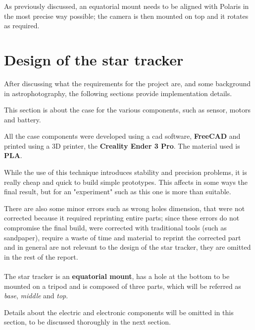 \documentclass[]{article}
\begin{document}
As previously discussed, an equatorial mount needs to be aligned with Polaris in the most precise way possible; the camera is then mounted on top and it rotates as required. 


\section{Design of the star tracker}
After discussing what the requirements for the project are, and some background in astrophotography, the following sections provide implementation details. 

This section is about the case for the various components, such as sensor, motors and battery. 

All the case components were developed using a cad software, \textbf{FreeCAD} and printed using a 3D printer, the \textbf{Creality Ender 3 Pro}. The material used is \textbf{PLA}. 
 
While the use of this technique introduces stability and precision problems, it is really cheap and quick to build simple prototypes. This affects in some ways  the final result, but for an "experiment" such as this one is more than suitable. 

There are also some minor errors such as wrong holes dimension, that were not corrected because it required reprinting entire parts; since these errors do not compromise the final build, were corrected with traditional tools (such as sandpaper), require a waste of time and material to reprint the corrected part and in general are not relevant to the design of the star tracker, they are omitted in the rest of the report. 
\\
\\
The star tracker is an \textbf{equatorial mount}, has a hole at the bottom to be mounted on a tripod and is composed of three parts, which will be referred as \textit{base}, \textit{middle} and \textit{top}. 

Details about the electric and electronic components will be omitted in this section, to be discussed thoroughly in the next section.  
\end{document}
